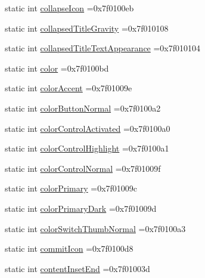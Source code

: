 \begin{DoxyCompactItemize}
\item 
static int \hyperlink{classandroid_1_1support_1_1v7_1_1cardview_1_1R_1_1attr_a0a8e0f7565352fa08daf97a416c9ceea}{collapse\+Icon} =0x7f0100eb
\item 
static int \hyperlink{classandroid_1_1support_1_1v7_1_1cardview_1_1R_1_1attr_ad40e98628ccb842b3417d04260e74b66}{collapsed\+Title\+Gravity} =0x7f010108
\item 
static int \hyperlink{classandroid_1_1support_1_1v7_1_1cardview_1_1R_1_1attr_a6badac0213756c6bf93f7cef451007a2}{collapsed\+Title\+Text\+Appearance} =0x7f010104
\item 
static int \hyperlink{classandroid_1_1support_1_1v7_1_1cardview_1_1R_1_1attr_a31fd3a6826f001af0482762741e11b2c}{color} =0x7f0100bd
\item 
static int \hyperlink{classandroid_1_1support_1_1v7_1_1cardview_1_1R_1_1attr_ae4b67ff4722615a50ba854b46c49d044}{color\+Accent} =0x7f01009e
\item 
static int \hyperlink{classandroid_1_1support_1_1v7_1_1cardview_1_1R_1_1attr_a790b4cbf7f9e74effc8b0f61310c0572}{color\+Button\+Normal} =0x7f0100a2
\item 
static int \hyperlink{classandroid_1_1support_1_1v7_1_1cardview_1_1R_1_1attr_a59fd03e0a464d197160b8c11316cc56a}{color\+Control\+Activated} =0x7f0100a0
\item 
static int \hyperlink{classandroid_1_1support_1_1v7_1_1cardview_1_1R_1_1attr_ac029806242aff5fd87d40c6135ca465d}{color\+Control\+Highlight} =0x7f0100a1
\item 
static int \hyperlink{classandroid_1_1support_1_1v7_1_1cardview_1_1R_1_1attr_a2e36c56263c970e32558384c77afe906}{color\+Control\+Normal} =0x7f01009f
\item 
static int \hyperlink{classandroid_1_1support_1_1v7_1_1cardview_1_1R_1_1attr_a5c781c3fb7e3cdf20c9e9975e9b8b63f}{color\+Primary} =0x7f01009c
\item 
static int \hyperlink{classandroid_1_1support_1_1v7_1_1cardview_1_1R_1_1attr_a715999d97332e449ff29b09233a24854}{color\+Primary\+Dark} =0x7f01009d
\item 
static int \hyperlink{classandroid_1_1support_1_1v7_1_1cardview_1_1R_1_1attr_a826fee7b51341a78531c2b55cea2e1b5}{color\+Switch\+Thumb\+Normal} =0x7f0100a3
\item 
static int \hyperlink{classandroid_1_1support_1_1v7_1_1cardview_1_1R_1_1attr_a279c2fff10e4895b410724ac6530869c}{commit\+Icon} =0x7f0100d8
\item 
static int \hyperlink{classandroid_1_1support_1_1v7_1_1cardview_1_1R_1_1attr_a8d34f6f6765a63fc1536f666306ebf8f}{content\+Inset\+End} =0x7f01003d

\end{DoxyCompactItemize}
